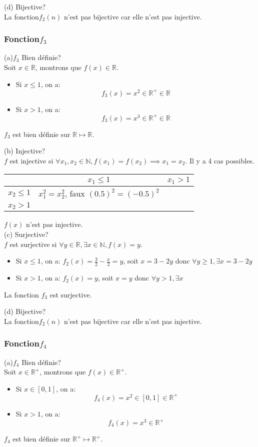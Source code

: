 \documentclass[]{book}
\theoremstyle{definition}
\newcommand{\bb}[1]{\mathbb{#1}}
\newcommand{\R}{\bb{R}}
\begin{document}
(d) Bijective?\\
La fonction$f_2(n)$ n'est pas bijective car elle n'est pas injective.

\subsubsection*{Fonction$f_3$}
(a)$f_3$ Bien d\'efinie?\\
Soit $x \in \R$, montrons que $f(x) \in \R$.
\begin{itemize}
\item Si $x \le 1$, on a: 
$$ f_3(x) = x^2 \in \R^{+} \in \R$$
\item Si $x > 1$, on a:
$$f_3(x) = x^3 \in \R^{+} \in \R$$
\end{itemize}
$f_3$ est bien d\'efinie sur $\R \mapsto \R$.

(b) Injective?\\
$f$ est injective si $\forall x_1, x_2 \in \mathbb{N}, f(x_1) = f(x_2) \implies x_1 = x_2$. Il y a 4 cas possibles.

\begin{center}
\begin{tabular}{c|c|c} 
                 & $x_1 \le 1$ & $x_1 > 1$ \\
      \hline
     $x_2 \le 1$ & $x_1^2 = x_2^2$, faux $(0.5)^2=(-0.5)^2$ & \\
      \hline
     $x_2 > 1$ & & \\
\end{tabular}
\end{center}
$f(x)$ n'est pas injective.\\

(c) Surjective?\\
$f$ est surjective si $\forall y \in \mathbb{R}, \exists x \in \mathbb{N}, f(x) = y$.\\
\begin{itemize}
\item Si $x \le 1$, on a: 
$ f_2(x) = \frac{3}{2} - \frac{x}{2} = y$, soit $x=3-2y$ donc $\forall y \ge 1, \exists x = 3 - 2y$
\item Si $x > 1$, on a:
$f_2(x) = y$, soit $x= y$ donc $\forall y >1, \exists x$
\end{itemize}
La fonction $f_3$ est surjective.

(d) Bijective?\\
La fonction$f_2(n)$ n'est pas bijective car elle n'est pas injective.

\subsubsection*{Fonction$f_4$}
(a)$f_4$ Bien d\'efinie?\\
Soit $x \in \R^{+}$, montrons que $f(x) \in \R^{+}$.
\begin{itemize}
\item Si $x \in [0,1]$, on a: 
$$ f_4(x) = x^2 \in [0,1] \in \R^{+}$$
\item Si $x > 1$, on a:
$$f_4(x) = x^3 \in \R^{+}$$
\end{itemize}
$f_4$ est bien d\'efinie  sur $\R^{+} \mapsto \R^{+}$.
\end{document}
